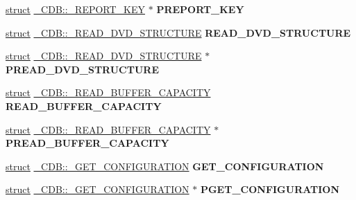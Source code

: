 \begin{DoxyCompactItemize}
\hyperlink{interfacestruct}{struct} \hyperlink{struct___c_d_b_1_1___r_e_p_o_r_t___k_e_y}{\+\_\+\+C\+D\+B\+::\+\_\+\+R\+E\+P\+O\+R\+T\+\_\+\+K\+EY} $\ast$ {\bfseries P\+R\+E\+P\+O\+R\+T\+\_\+\+K\+EY}
\item 
\mbox{\label{union___c_d_b_a4aa27cff7ac542650b2c99b0da8bd84b}} 
\hyperlink{interfacestruct}{struct} \hyperlink{struct___c_d_b_1_1___r_e_a_d___d_v_d___s_t_r_u_c_t_u_r_e}{\+\_\+\+C\+D\+B\+::\+\_\+\+R\+E\+A\+D\+\_\+\+D\+V\+D\+\_\+\+S\+T\+R\+U\+C\+T\+U\+RE} {\bfseries R\+E\+A\+D\+\_\+\+D\+V\+D\+\_\+\+S\+T\+R\+U\+C\+T\+U\+RE}
\item 
\mbox{\label{union___c_d_b_a72b11bb7283c9791a38139f8c079cbcd}} 
\hyperlink{interfacestruct}{struct} \hyperlink{struct___c_d_b_1_1___r_e_a_d___d_v_d___s_t_r_u_c_t_u_r_e}{\+\_\+\+C\+D\+B\+::\+\_\+\+R\+E\+A\+D\+\_\+\+D\+V\+D\+\_\+\+S\+T\+R\+U\+C\+T\+U\+RE} $\ast$ {\bfseries P\+R\+E\+A\+D\+\_\+\+D\+V\+D\+\_\+\+S\+T\+R\+U\+C\+T\+U\+RE}
\item 
\mbox{\label{union___c_d_b_a017df515d15a47c6b5ca588722d37cb6}} 
\hyperlink{interfacestruct}{struct} \hyperlink{struct___c_d_b_1_1___r_e_a_d___b_u_f_f_e_r___c_a_p_a_c_i_t_y}{\+\_\+\+C\+D\+B\+::\+\_\+\+R\+E\+A\+D\+\_\+\+B\+U\+F\+F\+E\+R\+\_\+\+C\+A\+P\+A\+C\+I\+TY} {\bfseries R\+E\+A\+D\+\_\+\+B\+U\+F\+F\+E\+R\+\_\+\+C\+A\+P\+A\+C\+I\+TY}
\item 
\mbox{\label{union___c_d_b_a53c5b93e134ddc5a5e3436a632869b61}} 
\hyperlink{interfacestruct}{struct} \hyperlink{struct___c_d_b_1_1___r_e_a_d___b_u_f_f_e_r___c_a_p_a_c_i_t_y}{\+\_\+\+C\+D\+B\+::\+\_\+\+R\+E\+A\+D\+\_\+\+B\+U\+F\+F\+E\+R\+\_\+\+C\+A\+P\+A\+C\+I\+TY} $\ast$ {\bfseries P\+R\+E\+A\+D\+\_\+\+B\+U\+F\+F\+E\+R\+\_\+\+C\+A\+P\+A\+C\+I\+TY}
\item 
\mbox{\label{union___c_d_b_a85c51236a0813f221cc84be8d07d339a}} 
\hyperlink{interfacestruct}{struct} \hyperlink{struct___c_d_b_1_1___g_e_t___c_o_n_f_i_g_u_r_a_t_i_o_n}{\+\_\+\+C\+D\+B\+::\+\_\+\+G\+E\+T\+\_\+\+C\+O\+N\+F\+I\+G\+U\+R\+A\+T\+I\+ON} {\bfseries G\+E\+T\+\_\+\+C\+O\+N\+F\+I\+G\+U\+R\+A\+T\+I\+ON}
\item 
\mbox{\label{union___c_d_b_afe6904367afd64c5c0b5198652aa8317}} 
\hyperlink{interfacestruct}{struct} \hyperlink{struct___c_d_b_1_1___g_e_t___c_o_n_f_i_g_u_r_a_t_i_o_n}{\+\_\+\+C\+D\+B\+::\+\_\+\+G\+E\+T\+\_\+\+C\+O\+N\+F\+I\+G\+U\+R\+A\+T\+I\+ON} $\ast$ {\bfseries P\+G\+E\+T\+\_\+\+C\+O\+N\+F\+I\+G\+U\+R\+A\+T\+I\+ON}

\end{DoxyCompactItemize}
